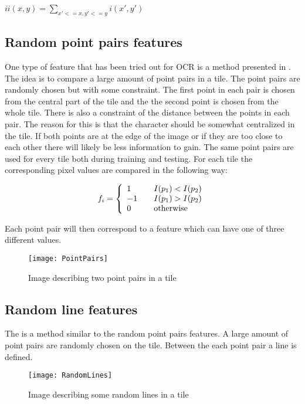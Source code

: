 \begin{center}
	$ii(x,y) = \sum_{x' <= x, y' <= y} i(x',y')$
\end{center}

\subsection{Random point pairs features}
\label{sec:Random point pairs features}
One type of feature that has been tried out for OCR is a method presented in \citep{Nenad}. The idea is to compare a large amount of point pairs in a tile. The point pairs are randomly chosen but with some constraint. The first point in each pair is chosen from the central part of the tile and the the second point is chosen from the whole tile. There is also a constraint of the distance between the points in each pair. The reason for this is that the character should be somewhat centralized in the tile. If both points are at the edge of the image or if they are too close to each other there will likely be less information to gain. The same point pairs are used for every tile both during training and testing. For each tile the corresponding pixel values are compared in the following way:
 \begin{center}
\[ f_i = \left\{ 
   \begin{array}{l l l}
     1 & \quad I(p_1)<I(p_2)\\
     -1 & \quad I(p_1)>I(p_2)\\
     0 & \quad \text{otherwise}
   \end{array} \right.\]
 \end{center}
Each point pair will then correspond to a feature which can have one of three different values. 
\begin{figure}[H]
\centering
	\texttt{[image: PointPairs]}
	\caption{Image describing two point pairs in a tile}
	\label{Two-rectangle}
\end{figure}



\subsection{Random line features}
\label{sec:Random line features}
The is a method similar to the random point pairs features. A large amount of point pairs are randomly chosen on the tile. Between the each point pair a line is defined.

\begin{figure}[H]
\centering
	\texttt{[image: RandomLines]}
	\caption{Image describing some random lines in a tile}
	\label{Two-rectangle}
\end{figure}
  
